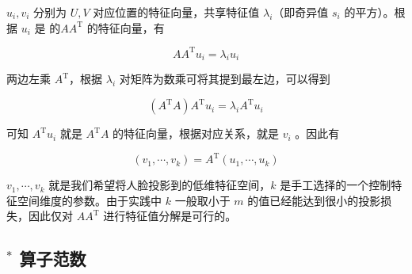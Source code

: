 $u_i, v_i$ 分别为 $U, V$ 对应位置的特征向量，共享特征值 $\lambda_i$（即奇异值 $s_i$ 的平方）。根据 $u_i$ 是 的$AA^{\mathrm{T}}$ 的特征向量，有

\[ AA^{\mathrm{T}} u_i = \lambda_i u_i \]

两边左乘 $A^{\mathrm{T}}$，根据 $\lambda_i$ 对矩阵为数乘可将其提到最左边，可以得到

\[ (A^{\mathrm{T}}A)A^{\mathrm{T}} u_i = \lambda_i A^{\mathrm{T}} u_i \]

可知 $A^{\mathrm{T}} u_i$ 就是 $A^{\mathrm{T}}A$ 的特征向量，根据对应关系，就是 $v_i$ 。因此有

\[ (v_1, \cdots, v_k) = A^{\mathrm{T}}(u_1, \cdots, u_k) \]

$v_1, \cdots, v_k$ 就是我们希望将人脸投影到的低维特征空间，$k$ 是手工选择的一个控制特征空间维度的参数。由于实践中 $k$ 一般取小于 $m$ 的值已经能达到很小的投影损失，因此仅对 $AA^{\mathrm{T}}$ 进行特征值分解是可行的。


\subsection*{$^*$ 算子范数}

\begin{summary}

\end{summary}

\begin{exercise}

    \begin{exgroup}
        \item
    \end{exgroup}

    \begin{exgroup}
        \item
    \end{exgroup}

    \begin{exgroup}
        \item
    \end{exgroup}
\end{exercise}
